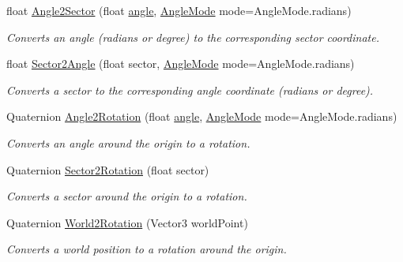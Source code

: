 \begin{DoxyCompactItemize}
float \hyperlink{class_g_f_polar_grid_ab11007629046b75d7a788f65a952fdaf_ab11007629046b75d7a788f65a952fdaf}{Angle2\+Sector} (float \hyperlink{class_g_f_polar_grid_ad57e2dcf03806e576191953034dcd74c_ad57e2dcf03806e576191953034dcd74c}{angle}, \hyperlink{namespace_grid_framework_af11322a36c09698c9ad2fa65f85320a9_af11322a36c09698c9ad2fa65f85320a9}{Angle\+Mode} mode=Angle\+Mode.\+radians)
\begin{DoxyCompactList}\small\item\em Converts an angle (radians or degree) to the corresponding sector coordinate.\end{DoxyCompactList}\item 
float \hyperlink{class_g_f_polar_grid_a675288b8c01f479b18411bb31c8d05eb_a675288b8c01f479b18411bb31c8d05eb}{Sector2\+Angle} (float sector, \hyperlink{namespace_grid_framework_af11322a36c09698c9ad2fa65f85320a9_af11322a36c09698c9ad2fa65f85320a9}{Angle\+Mode} mode=Angle\+Mode.\+radians)
\begin{DoxyCompactList}\small\item\em Converts a sector to the corresponding angle coordinate (radians or degree).\end{DoxyCompactList}\item 
Quaternion \hyperlink{class_g_f_polar_grid_a36467502f91e0fc6ca2247f2ce72ddaa_a36467502f91e0fc6ca2247f2ce72ddaa}{Angle2\+Rotation} (float \hyperlink{class_g_f_polar_grid_ad57e2dcf03806e576191953034dcd74c_ad57e2dcf03806e576191953034dcd74c}{angle}, \hyperlink{namespace_grid_framework_af11322a36c09698c9ad2fa65f85320a9_af11322a36c09698c9ad2fa65f85320a9}{Angle\+Mode} mode=Angle\+Mode.\+radians)
\begin{DoxyCompactList}\small\item\em Converts an angle around the origin to a rotation.\end{DoxyCompactList}\item 
Quaternion \hyperlink{class_g_f_polar_grid_a7cf5d37fe48331dc630dfedaf585e2e0_a7cf5d37fe48331dc630dfedaf585e2e0}{Sector2\+Rotation} (float sector)
\begin{DoxyCompactList}\small\item\em Converts a sector around the origin to a rotation.\end{DoxyCompactList}\item 
Quaternion \hyperlink{class_g_f_polar_grid_a7d03e8c0b4ec132f58c587539e0027c7_a7d03e8c0b4ec132f58c587539e0027c7}{World2\+Rotation} (Vector3 world\+Point)
\begin{DoxyCompactList}\small\item\em Converts a world position to a rotation around the origin.\end{DoxyCompactList}\item 

\end{DoxyCompactItemize}
